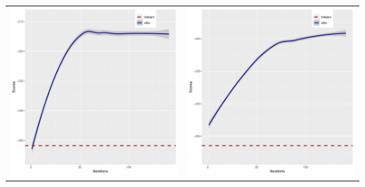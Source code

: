 \documentclass[]{scrartcl}
\begin{document}
\begin{tabular}{cc}
\includegraphics[scale = 0.4]{./figs/asia/mapEvolution-1-142.pdf} &
\includegraphics[scale = 0.4]{./figs/asia/mapEvolution-2-142.pdf} \\
\end{tabular}
\end{document}
